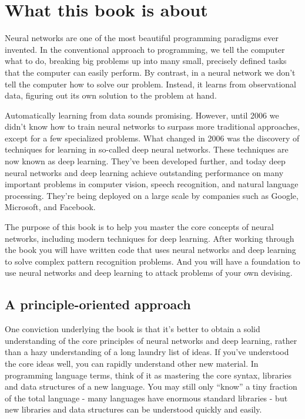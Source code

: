 \documentclass[a4paper,twoside,10pt]{book}
\begin{document}
\chapter*{What this book is about}

Neural networks are one of the most beautiful programming paradigms ever invented. In the conventional approach to programming, we tell the computer what to do, breaking big problems up into many small, precisely defined tasks that the computer can easily perform. By contrast, in a neural network we don't tell the computer how to solve our problem. Instead, it learns from observational data, figuring out its own solution to the problem at hand.

Automatically learning from data sounds promising. However, until 2006 we didn't know how to train neural networks to surpass more traditional approaches, except for a few specialized problems. What changed in 2006 was the discovery of techniques for learning in so-called deep neural networks. These techniques are now known as deep learning. They've been developed further, and today deep neural networks and deep learning achieve outstanding performance on many important problems in computer vision, speech recognition, and natural language processing. They're being deployed on a large scale by companies such as Google, Microsoft, and Facebook.

The purpose of this book is to help you master the core concepts of neural networks, including modern techniques for deep learning. After working through the book you will have written code that uses neural networks and deep learning to solve complex pattern recognition problems. And you will have a foundation to use neural networks and deep learning to attack problems of your own devising.

\section*{A principle-oriented approach}
One conviction underlying the book is that it's better to obtain a solid understanding of the core principles of neural networks and deep learning, rather than a hazy understanding of a long laundry list of ideas. If you've understood the core ideas well, you can rapidly understand other new material. In programming language terms, think of it as mastering the core syntax, libraries and data structures of a new language. You may still only ``know'' a tiny fraction of the total language - many languages have enormous standard libraries - but new libraries and data structures can be understood quickly and easily.
\end{document}
